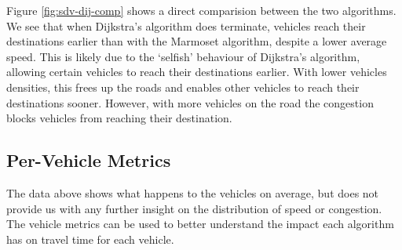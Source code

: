 \documentclass[ %
                    author={Alexander Hill},
                supervisor={Dr. Benjamin Sach},
                    degree={MEng},
                     title={MARMOSET},
                  subtitle={Multi-Agent Route Management using Online Simulation for Efficient Transportation},
                      type={research},
                      year={2016} ]{dissertation}
\begin{document}
Figure \ref{fig:sdv-dij-comp} shows a direct comparision between the two
algorithms. We see that when Dijkstra's algorithm does terminate, vehicles reach
their destinations earlier than with the Marmoset algorithm, despite a lower
average speed. This is likely due to the `selfish' behaviour of Dijkstra's
algorithm, allowing certain vehicles to reach their destinations earlier. With
lower vehicles densities, this frees up the roads and enables other vehicles to
reach their destinations sooner. However, with more vehicles on the road the
congestion blocks vehicles from reaching their destination.

\subsection{Per-Vehicle Metrics}

The data above shows what happens to the vehicles on average, but does not
provide us with any further insight on the distribution of speed or congestion.
The vehicle metrics can be used to better understand the impact each algorithm
has on travel time for each vehicle.
\end{document}
